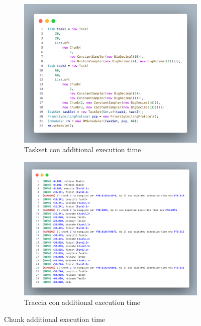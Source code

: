 \begin{figure}[htbp]
    \centering
    \begin{subfigure}{0.45\textwidth}
        \vfill
        \centering
        \includegraphics[width=.9\textwidth]{immagini/taskset additional ET chunk.pdf}
        \caption{Taskset con additional execution time}
        \label{fig:tasksetAdditionalET}
        \vfill
    \end{subfigure}
    \hfill
    \begin{subfigure}{0.45\textwidth}
        \vfill
        \centering
        \includegraphics[width=.9\textwidth]{immagini/trace additional ET chunk.pdf}
        \caption{Traccia con additional execution time}
        \label{fig:traceAdditionalET}
        \vfill
    \end{subfigure}
    \caption{Chunk additional execution time}
\end{figure}

